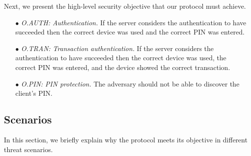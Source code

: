 \documentclass[runningheads]{llncs}
\begin{document}
Next, we present the high-level security objective that our protocol must achieve. 

\begin{itemize}
\item[$\bullet$]\textit{O.AUTH: Authentication.} If the server considers the authentication to have succeeded then the correct device was used and the correct PIN was entered.

\item[$\bullet$]\textit{O.TRAN: Transaction authentication.} If the server considers the authentication to have succeeded then the correct device was used, the correct PIN was entered, and the device showed the correct transaction.

\item[$\bullet$]\textit{O.PIN: PIN protection.} The adversary should not be able to discover the client's PIN. 
\end{itemize}



\subsection{Scenarios}
In this section, we briefly explain why the protocol meets its objective in different threat scenarios. 
\end{document}
